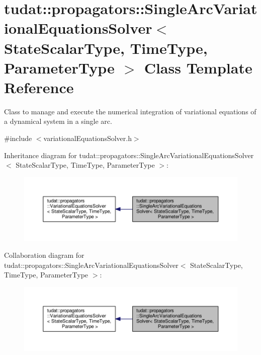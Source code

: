 \hypertarget{classtudat_1_1propagators_1_1SingleArcVariationalEquationsSolver}{}\section{tudat\+:\+:propagators\+:\+:Single\+Arc\+Variational\+Equations\+Solver$<$ State\+Scalar\+Type, Time\+Type, Parameter\+Type $>$ Class Template Reference}
\label{classtudat_1_1propagators_1_1SingleArcVariationalEquationsSolver}


Class to manage and execute the numerical integration of variational equations of a dynamical system in a single arc.  




{\ttfamily \#include $<$variational\+Equations\+Solver.\+h$>$}



Inheritance diagram for tudat\+:\+:propagators\+:\+:Single\+Arc\+Variational\+Equations\+Solver$<$ State\+Scalar\+Type, Time\+Type, Parameter\+Type $>$\+:
\nopagebreak
\begin{figure}[H]
\begin{center}
\leavevmode
\includegraphics[width=350pt]{classtudat_1_1propagators_1_1SingleArcVariationalEquationsSolver__inherit__graph}
\end{center}
\end{figure}


Collaboration diagram for tudat\+:\+:propagators\+:\+:Single\+Arc\+Variational\+Equations\+Solver$<$ State\+Scalar\+Type, Time\+Type, Parameter\+Type $>$\+:
\nopagebreak
\begin{figure}[H]
\begin{center}
\leavevmode
\includegraphics[width=350pt]{classtudat_1_1propagators_1_1SingleArcVariationalEquationsSolver__coll__graph}
\end{center}
\end{figure}
